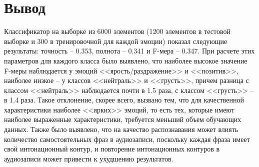 \section*{Вывод}
Классификатор на выборке из 6000 элементов (1200 элементов в тестовой выборке и 300 в тренировочной для каждой эмоции) показал следующие результаты: точность -- 0.353, полнота -- 0.341 и F-мера -- 0.347.    
При расчете этих параметров для каждого класса было выявлено, что наиболее высокое значение F-меры наблюдается у эмоций <<ярость/раздражение>> и <<позитив>>, наиболее низкое -- у классов <<нейтраль>> и <<грусть>>, причем разница с классом <<нейтраль>> наблюдается почти в 1.5 раза, с классом <<грусть>> -- в 1.4 раза. Такое отклонение, скорее всего, вызвано тем, что для качественной характеристики наиболее <<ярких>> эмоций, то есть тех, которые имеют наиболее выраженные характеристики, требуется меньший объем обучающих данных. Также было выявлено, что на качество распознавания может влиять количество самостоятельных фраз в аудиозаписи, поскольку каждая фраза имеет свой интонационный контур, и повторение интонационных контуров в аудиозаписи может привести к ухудшению результатов.